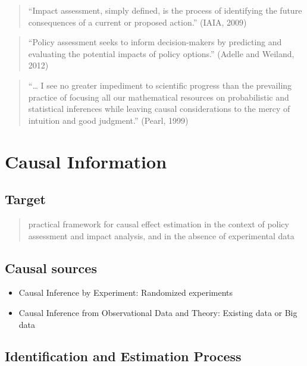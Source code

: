 \documentclass[]{book}
\providecommand{\tightlist}{%
  \setlength{\itemsep}{0pt}\setlength{\parskip}{0pt}}
\begin{document}
\begin{quote}
``Impact assessment, simply defined, is the process of identifying the future consequences of a current or proposed action.'' (IAIA, 2009)
\end{quote}

\begin{quote}
``Policy assessment seeks to inform decision-makers by predicting and evaluating the potential impacts of policy options.'' (Adelle and Weiland, 2012)
\end{quote}

\begin{quote}
``\ldots{} I see no greater impediment to scientific progress than the prevailing practice of focusing all our mathematical resources on probabilistic and statistical inferences while leaving causal considerations to the mercy of intuition and good judgment.'' (Pearl, 1999)
\end{quote}

\hypertarget{causal-information}{%
\section{Causal Information}\label{causal-information}}

\hypertarget{target}{%
\subsection{Target}\label{target}}

\begin{quote}
practical framework for causal effect estimation in the context of policy assessment and impact analysis, and in the absence of experimental data
\end{quote}

\hypertarget{causal-sources}{%
\subsection{Causal sources}\label{causal-sources}}

\begin{itemize}
\tightlist
\item
  Causal Inference by Experiment: Randomized experiments
\item
  Causal Inference from Observational Data and Theory: Existing data or Big data
\end{itemize}

\hypertarget{identification-and-estimation-process}{%
\subsection{Identification and Estimation Process}\label{identification-and-estimation-process}}
\end{document}
